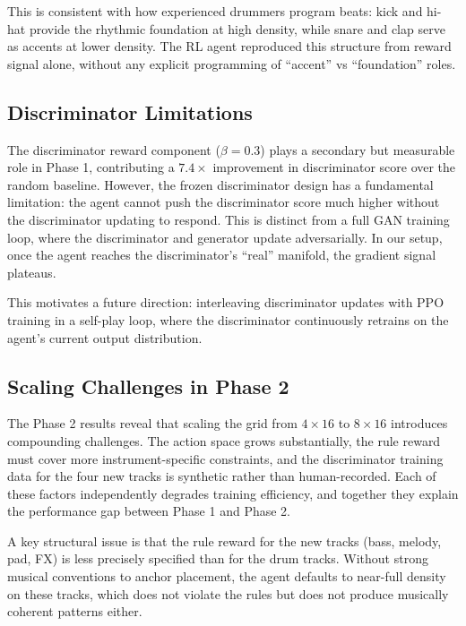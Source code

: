 \documentclass[11pt]{article}
\begin{document}
This is consistent with how experienced drummers program beats: kick and hi-hat provide the rhythmic foundation at high density, while snare and clap serve as accents at lower density. The RL agent reproduced this structure from reward signal alone, without any explicit programming of ``accent'' vs ``foundation'' roles.

\subsection{Discriminator Limitations}

The discriminator reward component ($\beta = 0.3$) plays a secondary but measurable role in Phase 1, contributing a $7.4\times$ improvement in discriminator score over the random baseline. However, the frozen discriminator design has a fundamental limitation: the agent cannot push the discriminator score much higher without the discriminator updating to respond. This is distinct from a full GAN training loop, where the discriminator and generator update adversarially. In our setup, once the agent reaches the discriminator's ``real'' manifold, the gradient signal plateaus.

This motivates a future direction: interleaving discriminator updates with PPO training in a self-play loop, where the discriminator continuously retrains on the agent's current output distribution.

\subsection{Scaling Challenges in Phase 2}

The Phase 2 results reveal that scaling the grid from $4 \times 16$ to $8 \times 16$ introduces compounding challenges. The action space grows substantially, the rule reward must cover more instrument-specific constraints, and the discriminator training data for the four new tracks is synthetic rather than human-recorded. Each of these factors independently degrades training efficiency, and together they explain the performance gap between Phase 1 and Phase 2.

A key structural issue is that the rule reward for the new tracks (bass, melody, pad, FX) is less precisely specified than for the drum tracks. Without strong musical conventions to anchor placement, the agent defaults to near-full density on these tracks, which does not violate the rules but does not produce musically coherent patterns either.
\end{document}
